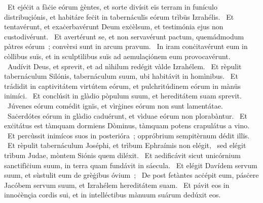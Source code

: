 {~Et ejéċit a fàċie eórum ġèntes, et sorte divísit eïs terram in funículo distribuçiónis, et habitáre feċit in tabernáculïs eórum trìbüs Izrahélis. 
~Et tentavérunt, et exaċerbavérunt Deum exċèlsum, et testimónia ejus non custodivérunt. 
~Et avertérunt se, et non servavérunt pactum, quemádmodum pàtres eórum~; convèrsi sunt in arcum pravum. 
~In iram conċitavérunt eum in còllibus suïs, et in sculptìlibus suïs ad aemulaçiónem eum provocavérunt. 
~Audívit Deus, et sprevit, et ad nìhilum redégit vàlde Izrahélem. 
~Et rèpulit tabernáculum Silónis, tabernáculum suum, ubi habitávit in homìnibus. 
~Et trádidit in captivitátem virtútem eórum, et pulchritúdinem eórum in mànüs inimíci. 
~Et conclúsit in glàdio pòpulum suum, et hereditátem suam sprevit. 
~Júvenes eórum comédit ignïs, et vìrġines eórum non sunt lamentátae. 
~Saċerdótes eórum in glàdio caduérunt, et vìduae eórum non plorabàntur. 
~Et exċitátus est tàmquam dormiens Dòminus, tàmquam potens crapulátus a vino. 
~Et percùssit inimícos suos in posterióra~; oppróbrium sempitèrnum dédit illïs. 
~Et rèpulit tabernáculum Joséphi, et trìbum Ephraímis non elégit, 
~sed elégit trìbum Judae, mòntem Siónis quem diléxit. 
~Et aedificávit sicut unicórnium sanctifìċium suum, in terra quam fundávit in sáecula. 
~Et elégit Davídem servum suum, et sùstulit eum de grèġibus óvium~; 
~De post fetàntes acċépit eum, pásċere Jacóbem servum suum, et Izrahélem hereditátem suam. 
~Et pávit eos in innoċènçia cordis sui, et in intelléctibus mànuum suárum dedúxit eos. 
}
